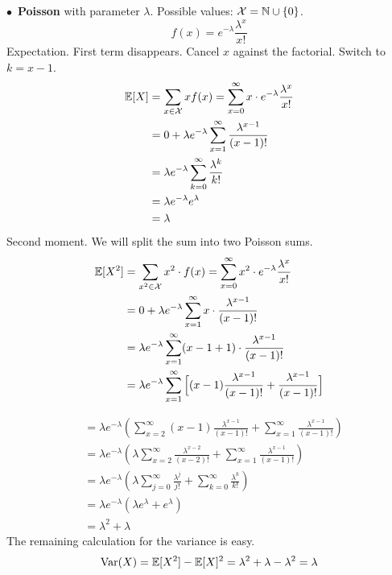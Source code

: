 \medskip\noindent$\bullet$ \textbf{Poisson} with parameter $\lambda$. Possible values: $\mathcal{X} = \mathbb{N}\cup\{0\}$.
$$
f(x) = e^{-\lambda}\frac{\lambda^x}{x!}
$$
Expectation. First term disappears. Cancel $x$ against the factorial. Switch to $k = x-1$. 
\begin{align*}
    \mathbb{E}[X] &= \sum_{x\in\mathcal{X}} xf(x) = \sum_{x=0}^\infty x\cdot e^{-\lambda}\frac{\lambda^x}{x!} \\
    &= 0 + \lambda e^{-\lambda}\sum_{x=1}^\infty\frac{\lambda^{x-1}}{(x-1)!} \\
    &= \lambda e^{-\lambda}\sum_{k=0}^\infty\frac{\lambda^k}{k!} \\
    &= \lambda e^{-\lambda}e^{\lambda} \\
    &= \lambda
\end{align*}
Second moment. We will split the sum into two Poisson sums.
\begin{align*}
    \mathbb{E}[X^2] &=  \sum_{x^2\in\mathcal{X}} x^2\cdot f(x) = \sum_{x=0}^\infty x^2\cdot e^{-\lambda}\frac{\lambda^x}{x!} \\
    &= 0 + \lambda e^{-\lambda}\sum_{x=1}^\infty x\cdot \frac{\lambda^{x-1}}{(x-1)!} \\
    &= \lambda e^{-\lambda}\sum_{x=1}^\infty (x - 1 + 1)\cdot \frac{\lambda^{x-1}}{(x-1)!} \\
    &= \lambda e^{-\lambda}\sum_{x=1}^\infty\Big[(x - 1)\frac{\lambda^{x-1}}{(x-1)!} + \frac{\lambda^{x-1}}{(x-1)!}\Big]
\end{align*}

\newpage\noindent
\begin{align*}
    &= \lambda e^{-\lambda}\left(\sum_{x=2}^\infty(x - 1)\frac{\lambda^{x-1}}{(x-1)!} + 
    \sum_{x=1}^\infty\frac{\lambda^{x-1}}{(x-1)!}\right) \\
    &= \lambda e^{-\lambda}\left(\lambda\sum_{x=2}^\infty\frac{\lambda^{x-2}}{(x-2)!} + 
    \sum_{x=1}^\infty\frac{\lambda^{x-1}}{(x-1)!}\right) \\
    &= \lambda e^{-\lambda}\left(\lambda\sum_{j=0}^\infty\frac{\lambda^{j}}{j!} + 
    \sum_{k=0}^\infty\frac{\lambda^{k}}{k!}\right) \\
    &= \lambda e^{-\lambda}\left(\lambda e^{\lambda} + e^{\lambda}\right) \\
    &= \lambda^2 + \lambda
\end{align*}
The remaining calculation for the variance is easy.
$$
\text{Var}(X) = \mathbb{E}[X^2] - \mathbb{E}[X]^2 = \lambda^2 + \lambda - \lambda^2 = \lambda
$$

